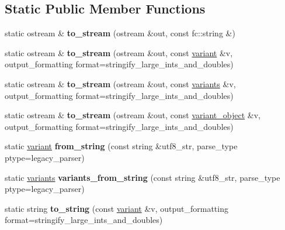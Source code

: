 \subsection*{Static Public Member Functions}
\begin{DoxyCompactItemize}
\item 
\mbox{\label{classfc_1_1json_aa1d154cb91a84d420062e5d843e6cec8}} 
static ostream \& {\bfseries to\+\_\+stream} (ostream \&out, const fc\+::string \&)
\item 
\mbox{\label{classfc_1_1json_aa4e816a0d095732a787745b879d2f570}} 
static ostream \& {\bfseries to\+\_\+stream} (ostream \&out, const \mbox{\hyperlink{classfc_1_1variant}{variant}} \&v, output\+\_\+formatting format=stringify\+\_\+large\+\_\+ints\+\_\+and\+\_\+doubles)
\item 
\mbox{\label{classfc_1_1json_a09872a21e6aa15d1884ef5c027c69b99}} 
static ostream \& {\bfseries to\+\_\+stream} (ostream \&out, const \mbox{\hyperlink{classstd_1_1vector}{variants}} \&v, output\+\_\+formatting format=stringify\+\_\+large\+\_\+ints\+\_\+and\+\_\+doubles)
\item 
\mbox{\label{classfc_1_1json_a31c9582c71579a9531c16c832830d4f4}} 
static ostream \& {\bfseries to\+\_\+stream} (ostream \&out, const \mbox{\hyperlink{classfc_1_1variant__object}{variant\+\_\+object}} \&v, output\+\_\+formatting format=stringify\+\_\+large\+\_\+ints\+\_\+and\+\_\+doubles)
\item 
\mbox{\label{classfc_1_1json_a901005a3b44077cb8deee9a0a579c5c3}} 
static \mbox{\hyperlink{classfc_1_1variant}{variant}} {\bfseries from\+\_\+string} (const string \&utf8\+\_\+str, parse\+\_\+type ptype=legacy\+\_\+parser)
\item 
\mbox{\label{classfc_1_1json_a2377300f058fba17410e45b98b5c329a}} 
static \mbox{\hyperlink{classstd_1_1vector}{variants}} {\bfseries variants\+\_\+from\+\_\+string} (const string \&utf8\+\_\+str, parse\+\_\+type ptype=legacy\+\_\+parser)
\item 
\mbox{\label{classfc_1_1json_a1fcafc2c5ff61d8d07515610efe2d374}} 
static string {\bfseries to\+\_\+string} (const \mbox{\hyperlink{classfc_1_1variant}{variant}} \&v, output\+\_\+formatting format=stringify\+\_\+large\+\_\+ints\+\_\+and\+\_\+doubles)

\end{DoxyCompactItemize}
